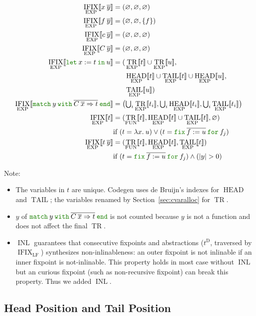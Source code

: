\documentclass[a4paper,fleqn]{article}
\def\codegen{\textrm{Codegen}}
\newcommand{\kwlet}{\mbox{\color{mygreen}\ttfamily let}}
\newcommand{\kwin}{\mbox{\color{mygreen}\ttfamily in}}
\newcommand{\kwmatch}{\mbox{\color{mygreen}\ttfamily match}}
\newcommand{\kwwith}{\mbox{\color{mygreen}\ttfamily with}}
\newcommand{\kwend}{\mbox{\color{mygreen}\ttfamily end}}
\newcommand{\kwfix}{\mbox{\color{mygreen}\ttfamily fix}}
\newcommand{\kwfor}{\mbox{\color{mygreen}\ttfamily for}}
\newcommand{\lam}[2]{\lambda #1.\:#2}
\newcommand{\letin}[3]{\kwlet\:#1:=#2\:\kwin\:#3}
\newcommand{\omatch}[2]{\kwmatch\:#1\:\kwwith\:{#2}\:\kwend}
\newcommand{\ofix}[2]{\kwfix\:{#1}\:\kwfor\:{#2}}
\newcommand{\tD}{t^\mathrm{D}}
\newcommand{\tbigcup}{{\textstyle\bigcup}}
\newcommand{\BRA}[1]{\llbracket #1 \rrbracket}
\DeclareMathOperator{\TRop}{TR}
\newcommand{\TRFUN}[1]{\TRop_\text{FUN}\BRA{#1}}
\newcommand{\TREXP}[1]{\TRop_\text{EXP}\BRA{#1}}
\DeclareMathOperator{\INLop}{INL}
\DeclareMathOperator{\RNTop}{IFIX}
\newcommand{\RNTEXP}[1]{\RNTop_\text{EXP}\BRA{#1}}
\DeclareMathOperator{\MyH}{HEAD}
\DeclareMathOperator{\MyT}{TAIL}
\newcommand{\HEXP}[1]{\MyH_\text{EXP}\BRA{#1}}
\newcommand{\TEXP}[1]{\MyT_\text{EXP}\BRA{#1}}
\newcommand{\secref}[1]{Section~\ref{#1}}
\newcommand{\rep}[1]{\overline{#1}}
\begin{document}
\begin{align*}
  \RNTEXP{x\:\rep{y}} &= (\varnothing, \varnothing, \varnothing) \\
  \RNTEXP{f\:\rep{y}} &= (\varnothing, \varnothing, \{f\}) \\
  \RNTEXP{c\:\rep{y}} &= (\varnothing, \varnothing, \varnothing) \\
  \RNTEXP{C\:\rep{y}} &= (\varnothing, \varnothing, \varnothing) \\
  \RNTEXP{\letin{x}{t}{u}} &=
    ( \begin{aligned}[t]
      & \TREXP{t} \cup \TREXP{u}, \\
      & \HEXP{t} \cup \TEXP{t} \cup \HEXP{u}, \\
      & \TEXP{u})
      \end{aligned} \\
  \RNTEXP{\omatch{y}{\rep{C\:\rep{x}\Rightarrow t}}} &= \bigl(\tbigcup_i \TREXP{t_i}, \tbigcup_i \HEXP{t_i}, \tbigcup_i \TEXP{t_i} \bigr) \\
  \RNTEXP{t} &= (\TRFUN{t}, \HEXP{t} \cup \TEXP{t}, \varnothing) \\
    & \text{if}~(t = \lam{x}{u}) \vee (t = \ofix{\rep{f:=u}}{f_j}) \\
  \RNTEXP{t\:\rep{y}} &= (\TRFUN{t}, \HEXP{t}, \TEXP{t}) \\
    & \text{if}~(t = \ofix{\rep{f:=u}}{f_j}) \wedge (|y| > 0)
\end{align*}

{\small Note:
\begin{itemize}
  \item The variables in $t$ are unique.
    \codegen{} uses de Bruijn's indexes for $\MyH$ and $\MyT$;
    the variables renamed by \secref{sec:cvaralloc} for $\TRop$.
  \item $y$ of $\omatch{y}{\rep{C\:\rep{x}\Rightarrow t}}$ is not counted because $y$ is not a function and does not affect the final $\TRop$.
  \item $\INLop$ guarantees that consecutive fixpoints and abstractions ($\tD$, traversed by $\RNTop_\text{LF}$) synthesizes non-inlinableness:
    an outer fixpoint is not inlinable if an inner fixpoint is not-inlinable.
    This property holds in most case without $\INLop$ but an curious fixpoint (such as non-recursive fixpoint) can break this property.
    Thus we added $\INLop$.
\end{itemize}}

\subsection{Head Position and Tail Position}\label{sec:head-position-and-tail-position}
\end{document}
